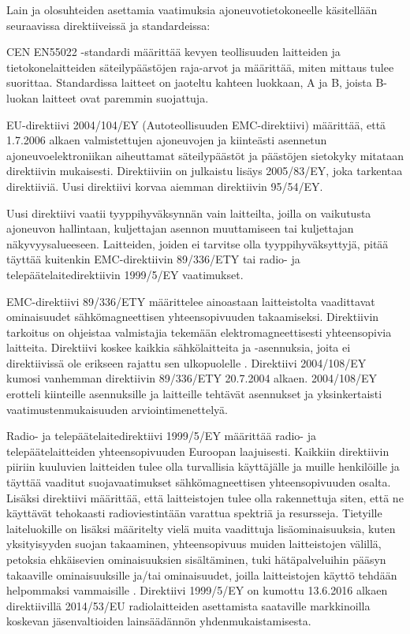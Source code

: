 Lain ja olosuhteiden asettamia vaatimuksia ajoneuvotietokoneelle käsitellään seuraavissa direktiiveissä ja standardeissa:

CEN EN55022 -standardi määrittää kevyen teollisuuden laitteiden ja tietokonelaitteiden säteilypäästöjen raja-arvot ja määrittää, miten mittaus tulee suorittaa. Standardissa laitteet on jaoteltu kahteen luokkaan, A ja B, joista B-luokan laitteet ovat paremmin suojattuja. \citep{EN55022}

EU-direktiivi 2004/104/EY (Autoteollisuuden EMC-direktiivi) määrittää, että 1.7.2006 alkaen valmistettujen ajoneuvojen ja kiinteästi asennetun ajoneuvoelektroniikan aiheuttamat säteilypäästöt ja päästöjen sietokyky mitataan direktiivin mukaisesti. Direktiiviin on julkaistu lisäys 2005/83/EY, joka tarkentaa direktiiviä. Uusi direktiivi korvaa aiemman direktiivin 95/54/EY.

Uusi direktiivi vaatii tyyppihyväksynnän vain laitteilta, joilla on
vaikutusta ajoneuvon hallintaan, kuljettajan asennon muuttamiseen tai
kuljettajan näkyvyysalueeseen. Laitteiden, joiden ei tarvitse olla
tyyppihyväksyttyjä, pitää täyttää kuitenkin EMC-direktiivin 89/336/ETY
tai radio- ja telepäätelaitedirektiivin 1999/5/EY vaatimukset. \citep{1999/5/EY,89/336/ETY}

EMC-direktiivi 89/336/ETY määrittelee ainoastaan laitteistolta vaadittavat ominaisuudet sähkömagneettisen yhteensopivuuden takaamiseksi. Direktiivin tarkoitus on ohjeistaa valmistajia tekemään elektromagneettisesti yhteensopivia laitteita. Direktiivi koskee kaikkia sähkölaitteita ja -asennuksia, joita ei direktiivissä ole erikseen rajattu sen ulkopuolelle \cite{89/336/ETY}. Direktiivi 2004/108/EY kumosi vanhemman direktiivin 89/336/ETY 20.7.2004 alkaen. 2004/108/EY  erotteli kiinteille asennuksille ja laitteille tehtävät asennukset ja yksinkertaisti vaatimustenmukaisuuden arviointimenettelyä. \citep{2004/108/EY}

Radio- ja telepäätelaitedirektiivi 1999/5/EY määrittää radio- ja telepäätelaitteiden yhteensopivuuden Euroopan laajuisesti. Kaikkiin direktiivin piiriin kuuluvien laitteiden tulee olla turvallisia käyttäjälle ja muille henkilöille ja täyttää vaaditut suojavaatimukset sähkömagneettisen yhteensopivuuden osalta. Lisäksi
direktiivi määrittää, että laitteistojen tulee olla rakennettuja siten, että ne käyttävät tehokaasti radioviestintään varattua spektriä ja resursseja. Tietyille laiteluokille on lisäksi määritelty vielä muita vaadittuja lisäominaisuuksia, kuten yksityisyyden suojan takaaminen, yhteensopivuus muiden laitteistojen välillä, petoksia ehkäisevien ominaisuuksien sisältäminen, tuki hätäpalveluihin pääsyn takaaville ominaisuuksille ja/tai ominaisuudet, joilla laitteistojen
käyttö tehdään helpommaksi vammaisille \cite{1999/5/EY}. Direktiivi 1999/5/EY on kumottu 13.6.2016 alkaen direktiivillä 2014/53/EU radiolaitteiden asettamista saataville markkinoilla koskevan jäsenvaltioiden lainsäädännön yhdenmukaistamisesta. \citep{2014/53/EU}

